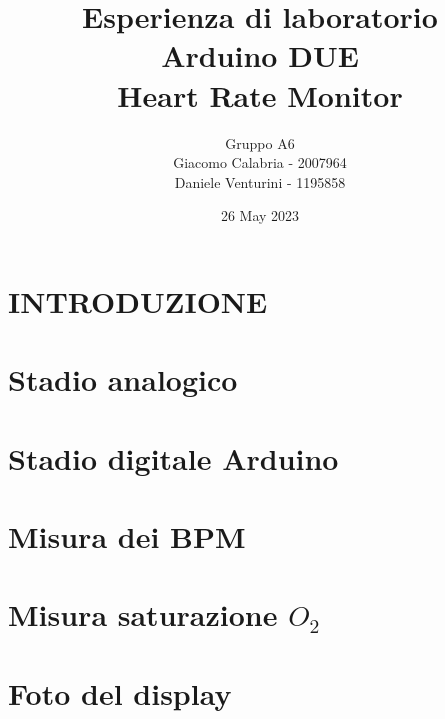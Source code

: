 \documentclass{article}
\title{Esperienza di laboratorio\\\textbf{Arduino DUE\\Heart Rate Monitor}}
\author{Gruppo A6\\Giacomo Calabria - 2007964\\Daniele Venturini - 1195858}
\date{26 May 2023}
\begin{document}
    \maketitle
    \tableofcontents
    \clearpage
    \section{INTRODUZIONE}
    
    
    \section{Stadio analogico}
    
    \clearpage
    
    \section{Stadio digitale Arduino}
        
    \section{Misura dei BPM}
        
    \section{Misura saturazione $O_2$}
    
    \section{Foto del display}
    
\end{document}
